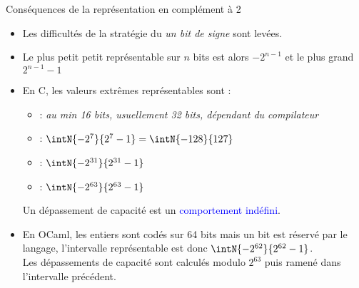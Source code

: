 \documentclass[10pt]{beamer}
\begin{document}
\begin{frame}{\Ctitle}{\stitle}
	\begin{block}{Conséquences de la représentation en complément à 2}
		\begin{itemize}
			\item<1-> Les difficultés de la stratégie du \textit{un bit de signe} sont levées.
			\item<2-> Le plus petit petit représentable sur $n$ bits est alors $-2^{n-1}$ et le plus grand $2^{n-1}-1$
			\item<3-> En C, les valeurs extrêmes représentables sont :
				\begin{itemize}
					\item<4->  : \textit{au min 16 bits, usuellement 32 bits, dépendant du compilateur}
					\item<5->  : $\intN{-2^7}{2^7-1} = \intN{-128}{127}$
					\item<6->   : $\intN{-2^{31}}{2^{31}-1}$
					\item<7->   : $\intN{-2^{63}}{2^{63}-1}$
				\end{itemize}
				 \textcolor{red}{\danger} Un dépassement de capacité est un \textcolor{blue}{comportement indéfini}.
			\item<9-> En OCaml, les entiers sont codés sur 64 bits mais un bit est réservé par le langage, l'intervalle représentable est donc $\intN{-2^{62}}{2^{62}-1}$.\\
				\onslide<10-> Les dépassements de capacité sont calculés modulo  $2^{63}$ puis ramené dans l'intervalle précédent.
		\end{itemize}
	\end{block}
\end{frame}
\end{document}
